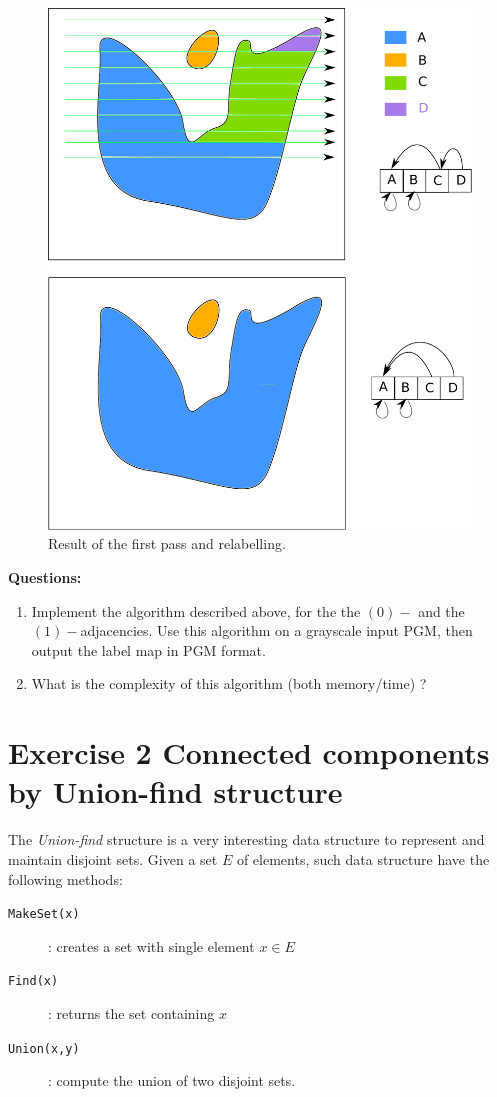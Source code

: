 \documentclass[a4paper, 11pt, french]{article}
\begin{document}
\begin{figure}[ht]
	\begin{center}
	\includegraphics[width=12cm]{connected}
	\caption{Result of the first pass and relabelling.\label{fig:connected}}
	\end{center}
\end{figure}


{\bf Questions:}
\begin{enumerate}
	\item Implement the algorithm described above, for the the $(0)-$ and the $(1)-$adjacencies. Use this algorithm on a grayscale input PGM, then output the label map in PGM format. 
	\item What is the complexity of this algorithm (both memory/time) ?
\end{enumerate}



\section*{Exercise 2 \rm Connected components by Union-find structure}

\par The \emph{Union-find} structure is a very interesting data structure to represent and maintain disjoint sets. Given a set $E$ of elements, such data structure have the following methods: 
\begin{description}
	\item[\texttt{MakeSet(x)}]: creates a set with single element $x\in E$
	\item[\texttt{Find(x)}]: returns the set containing $x$
	\item[\texttt{Union(x,y)}]: compute the union of two disjoint sets.
\end{description}
\end{document}
